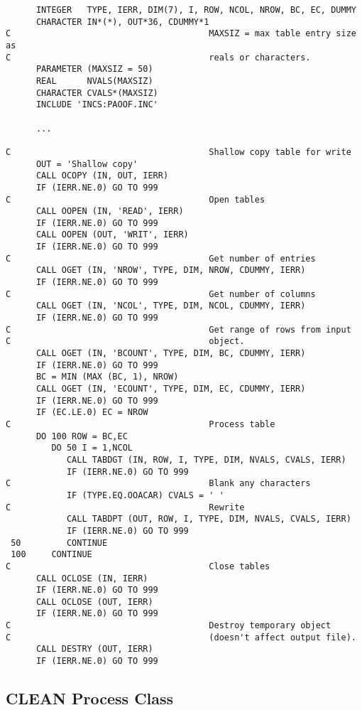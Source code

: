 {\small\begin{verbatim}
      INTEGER   TYPE, IERR, DIM(7), I, ROW, NCOL, NROW, BC, EC, DUMMY
      CHARACTER IN*(*), OUT*36, CDUMMY*1
C                                       MAXSIZ = max table entry size as
C                                       reals or characters.
      PARAMETER (MAXSIZ = 50)
      REAL      NVALS(MAXSIZ)
      CHARACTER CVALS*(MAXSIZ)
      INCLUDE 'INCS:PAOOF.INC'

      ...

C                                       Shallow copy table for write
      OUT = 'Shallow copy'
      CALL OCOPY (IN, OUT, IERR)
      IF (IERR.NE.0) GO TO 999
C                                       Open tables
      CALL OOPEN (IN, 'READ', IERR)
      IF (IERR.NE.0) GO TO 999
      CALL OOPEN (OUT, 'WRIT', IERR)
      IF (IERR.NE.0) GO TO 999
C                                       Get number of entries
      CALL OGET (IN, 'NROW', TYPE, DIM, NROW, CDUMMY, IERR)
      IF (IERR.NE.0) GO TO 999
C                                       Get number of columns
      CALL OGET (IN, 'NCOL', TYPE, DIM, NCOL, CDUMMY, IERR)
      IF (IERR.NE.0) GO TO 999
C                                       Get range of rows from input
C                                       object.
      CALL OGET (IN, 'BCOUNT', TYPE, DIM, BC, CDUMMY, IERR)
      IF (IERR.NE.0) GO TO 999
      BC = MIN (MAX (BC, 1), NROW)
      CALL OGET (IN, 'ECOUNT', TYPE, DIM, EC, CDUMMY, IERR)
      IF (IERR.NE.0) GO TO 999
      IF (EC.LE.0) EC = NROW
C                                       Process table
      DO 100 ROW = BC,EC
         DO 50 I = 1,NCOL
            CALL TABDGT (IN, ROW, I, TYPE, DIM, NVALS, CVALS, IERR)
            IF (IERR.NE.0) GO TO 999
C                                       Blank any characters
            IF (TYPE.EQ.OOACAR) CVALS = ' '
C                                       Rewrite
            CALL TABDPT (OUT, ROW, I, TYPE, DIM, NVALS, CVALS, IERR)
            IF (IERR.NE.0) GO TO 999
 50         CONTINUE
 100     CONTINUE
C                                       Close tables
      CALL OCLOSE (IN, IERR)
      IF (IERR.NE.0) GO TO 999
      CALL OCLOSE (OUT, IERR)
      IF (IERR.NE.0) GO TO 999
C                                       Destroy temporary object
C                                       (doesn't affect output file).
      CALL DESTRY (OUT, IERR)
      IF (IERR.NE.0) GO TO 999
\end{verbatim}}
\subsection{CLEAN Process Class}


